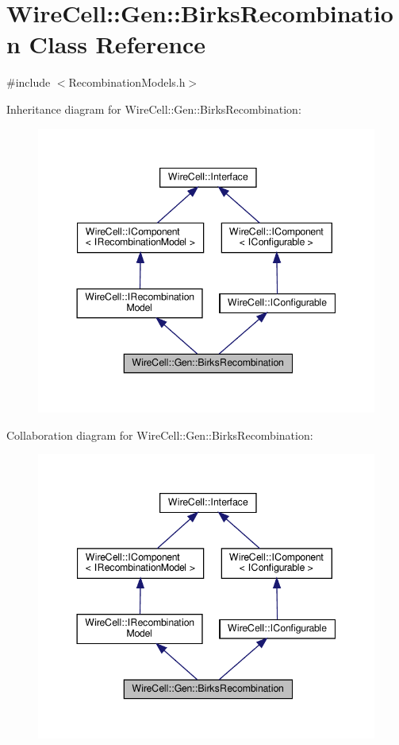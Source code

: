 \hypertarget{class_wire_cell_1_1_gen_1_1_birks_recombination}{}\section{Wire\+Cell\+:\+:Gen\+:\+:Birks\+Recombination Class Reference}
\label{class_wire_cell_1_1_gen_1_1_birks_recombination}


{\ttfamily \#include $<$Recombination\+Models.\+h$>$}



Inheritance diagram for Wire\+Cell\+:\+:Gen\+:\+:Birks\+Recombination\+:
\nopagebreak
\begin{figure}[H]
\begin{center}
\leavevmode
\includegraphics[width=344pt]{class_wire_cell_1_1_gen_1_1_birks_recombination__inherit__graph}
\end{center}
\end{figure}


Collaboration diagram for Wire\+Cell\+:\+:Gen\+:\+:Birks\+Recombination\+:
\nopagebreak
\begin{figure}[H]
\begin{center}
\leavevmode
\includegraphics[width=344pt]{class_wire_cell_1_1_gen_1_1_birks_recombination__coll__graph}
\end{center}
\end{figure}
